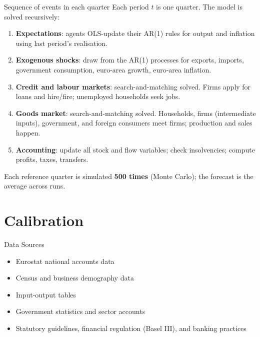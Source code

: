 \documentclass[9pt]{beamer}
\begin{document}
\begin{frame}{Sequence of events in each quarter}
    \small
    Each period $t$ is one quarter. The model is solved recursively:
    \begin{enumerate}
        \item[\textbf{(i)}] \textbf{Expectations}: agents OLS-update their AR(1) rules for output and inflation using last period's realisation.
        \item[\textbf{(ii)}] \textbf{Exogenous shocks}: draw from the AR(1) processes for exports, imports, government consumption, euro-area growth, euro-area inflation.
        \item[\textbf{(iii)}] \textbf{Credit and labour markets}: search-and-matching solved. Firms apply for loans and hire/fire; unemployed households seek jobs.
        \item[\textbf{(iv)}] \textbf{Goods market}: search-and-matching solved. Households, firms (intermediate inputs), government, and foreign consumers meet firms; production and sales happen.
        \item[\textbf{(v)}] \textbf{Accounting}: update all stock and flow variables; check insolvencies; compute profits, taxes, transfers.
    \end{enumerate}
    \vspace{0.3em}
    Each reference quarter is simulated \textbf{500 times} (Monte Carlo); the forecast is the average across runs.
\end{frame}

\section{Calibration}
\begin{frame}{Data Sources}
    \begin{itemize}
        \item Eurostat national accounts data
        \item Census and business demography data
        \item Input-output tables
        \item Government statistics and sector accounts
        \item Statutory guidelines, financial regulation (Basel III), and banking practices
    \end{itemize}
\end{frame}
\end{document}
